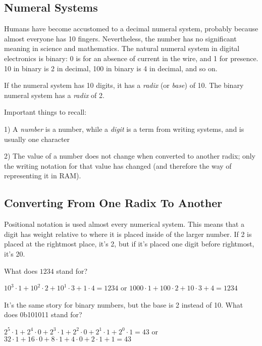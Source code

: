 \subsection{Numeral Systems}

Humans have become accustomed to a decimal numeral system, probably because almost everyone has 10 fingers.
Nevertheless, the number  has no significant meaning in science and mathematics.
The natural numeral system in digital electronics is binary: 0 is for an absence of current in the wire, and 1 for presence.
10 in binary is 2 in decimal, 100 in binary is 4 in decimal, and so on.

If the numeral system has 10 digits, it has a \emph{radix} (or \emph{base}) of 10.
The binary numeral system has a \emph{radix} of 2.

Important things to recall:

1) A \emph{number} is a number, while a \emph{digit} is a term from writing systems, and is usually one character

2) The value of a number does not change when converted to another radix; only the writing notation for that value has changed (and therefore the way of representing it in \ac{RAM}).

\subsection{Converting From One Radix To Another}

Positional notation is used almost every numerical system. This means that a digit has weight relative to where it is placed inside of the larger number.
If 2 is placed at the rightmost place, it's 2, but if it's placed one digit before rightmost, it's 20.

What does $1234$ stand for?

$10^3 \cdot 1 + 10^2 \cdot 2 + 10^1 \cdot 3 + 1 \cdot 4 = 1234$ or
$1000 \cdot 1 + 100 \cdot 2 + 10 \cdot 3 + 4 = 1234$

It's the same story for binary numbers, but the base is 2 instead of 10.
What does 0b101011 stand for?

$2^5 \cdot 1 + 2^4 \cdot 0 + 2^3 \cdot 1 + 2^2 \cdot 0 + 2^1 \cdot 1 + 2^0 \cdot 1 = 43$ or
$32 \cdot 1 + 16 \cdot 0 + 8 \cdot 1 + 4 \cdot 0 + 2 \cdot 1 + 1 = 43$

